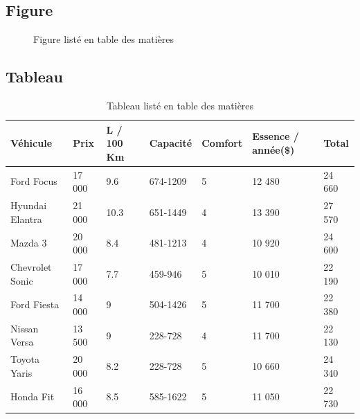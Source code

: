 \pagebreak










\begin{spacing}{1.5}
\subsection{Figure}
\begin{figure}[hbtp]
\caption{Figure listé en table des matières}
\centering
{}
\end{figure}

\subsection{Tableau}
\begin{table}[!ht]
\caption{Tableau listé en table des matières}
\medskip
\centering
\begin{tabular}{||l|l|l|l|l|l|l||}
\hline 
\textbf{Véhicule} & \textbf{Prix} & \textbf{L / 100 Km} & \textbf{Capacité} & \textbf{Comfort} & \textbf{Essence / année(\$)} & \textbf{Total} \\ 
\hline 
Ford Focus & 17 000 & 9.6 & 674-1209 & 5 & 12 480 & 24 660 \\ 
\hline 
Hyundai Elantra & 21 000 & 10.3 & 651-1449 & 4 & 13 390 & 27 570 \\ 
\hline 
Mazda 3 & 20 000 & 8.4 & 481-1213 & 4 & 10 920 & 24 600 \\ 
\hline 
Chevrolet Sonic & 17 000 & 7.7 & 459-946 & 5 & 10 010 & 22 190 \\ 
\hline 
Ford Fiesta & 14 000 & 9 & 504-1426 & 5 & 11 700 & 22 380 \\ 
\hline 
Nissan Versa & 13 500 & 9 & 228-728 & 4 & 11 700 & 22 130 \\ 
\hline 
Toyota Yaris  & 20 000 & 8.2 & 228-728 & 5 & 10 660 & 24 340 \\ 
\hline 
Honda Fit & 16 000 & 8.5 & 585-1622 & 5 & 11 050 & 22 730 \\ 
\hline 
\end{tabular} 
\label{tab:testtab1}
\end{table}


\end{spacing}
